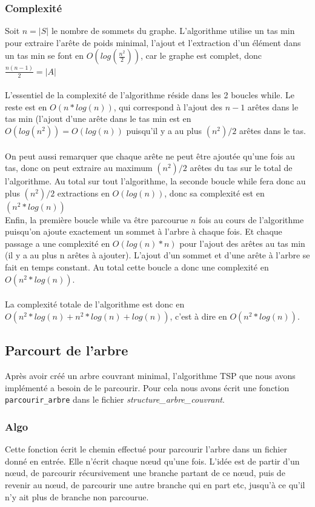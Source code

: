 \documentclass[a4paper,11pt]{article}
\begin{document}
\subsubsection*{Complexité}

Soit $n=|S|$ le nombre de sommets du graphe.
L'algorithme utilise un tas min pour extraire l'arête de poids minimal, l'ajout et l'extraction d'un élément dans un tas min se font en $O(log(\frac{n^2}{2}))$, car le graphe est complet, donc $\frac{n(n-1)}{2} = |A|$\\
\\
L'essentiel de la complexité de l'algorithme réside dans les 2 boucles while. Le reste est en $O(n*log(n))$, qui correspond à l'ajout des $n-1$ arêtes dans le tas min (l'ajout d'une arête dans le tas min est en $O(log(n^2)) = O(log(n))$ puisqu'il y a au plus $(n^2)/2$ arêtes dans le tas.\\
\\
On peut aussi remarquer que chaque arête ne peut être ajoutée qu'une fois au tas, donc on peut extraire au maximum $(n^2)/2$ arêtes du tas sur le total de l'algorithme. Au total sur tout l'algorithme, la seconde boucle while fera donc au plus $(n^2)/2$ extractions en $O(log(n))$, donc sa complexité est en $(n^2*log(n))$\\
Enfin, la première boucle while va être parcourue $n$ fois au cours de l'algorithme puisqu'on ajoute exactement un sommet à l'arbre à chaque fois. Et chaque passage a une complexité en $O(log(n)*n)$ pour l'ajout des arêtes au tas min (il y a au plus n arêtes à ajouter). L'ajout d'un sommet et d'une arête à l'arbre se fait en temps constant. Au total cette boucle a donc une complexité en $O(n^2*log(n))$.\\
\\
La complexité totale de l'algorithme est donc en $O(n^2*log(n)+n^2*log(n)+log(n))$, c'est à dire en $O(n^2*log(n))$.


\subsection{Parcourt de l'arbre} %

Après avoir créé un arbre couvrant minimal, l'algorithme TSP que nous avons implémenté a besoin de le parcourir. Pour cela nous avons écrit une fonction \texttt{parcourir\_arbre} dans le fichier \textit{structure\_arbre\_couvrant}.

\subsubsection*{Algo}
Cette fonction écrit le chemin effectué pour parcourir l'arbre dans un fichier donné en entrée. Elle n'écrit chaque nœud qu'une fois. L'idée est de partir d'un nœud, de parcourir récursivement une branche partant de ce nœud, puis de revenir au nœud, de parcourir une autre branche qui en part etc, jusqu'à ce qu'il n'y ait plus de branche non parcourue.
\end{document}
